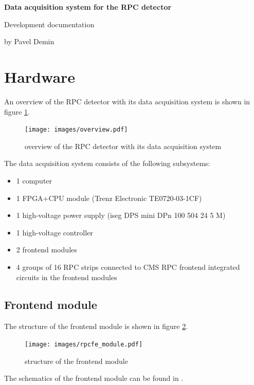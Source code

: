 \documentclass[12pt, a4paper]{article}
\begin{document}
\begin{flushright}
\bfseries\upshape\Large
Data acquisition system for the RPC detector

Development documentation

by Pavel Demin
\end{flushright}

\tableofcontents

\section{Hardware}

An overview of the RPC detector with its data acquisition system is shown in figure \ref{fig:overview}.

\begin{figure}[h!]
  \centering
  \texttt{[image: images/overview.pdf]}
  \caption{overview of the RPC detector with its data acquisition system}
  \label{fig:overview}
\end{figure}

The data acquisition system consists of the following subsystems:
\begin{itemize}[nosep]
  \item 1 computer
  \item 1 FPGA+CPU module (Trenz Electronic TE0720-03-1CF) \cite{te0720}
  \item 1 high-voltage power supply (iseg DPS mini DPn 100 504 24 5 M) \cite{dpsmini}
  \item 1 high-voltage controller
  \item 2 frontend modules \cite{rpcfesch}
  \item 4 groups of 16 RPC strips connected to CMS RPC frontend integrated circuits \cite{rpcnim2000} in the frontend modules
\end{itemize}

\subsection{Frontend module}

The structure of the frontend module is shown in figure \ref{fig:rpcfe_module}.

\begin{figure}[h!]
  \centering
  \texttt{[image: images/rpcfe\_module.pdf]}
  \caption{structure of the frontend module}
  \label{fig:rpcfe_module}
\end{figure}

The schematics of the frontend module can be found in \cite{rpcfesch}.
\end{document}
